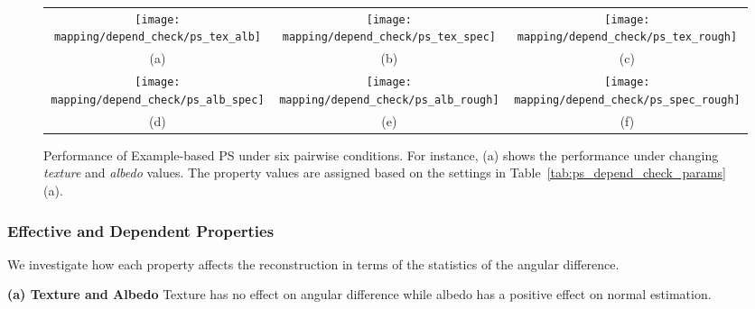 \begin{sidewaysfigure}[!htbp]
\begin{tabular}{ccc}
\texttt{[image: mapping/depend\_check/ps\_tex\_alb]}&
\texttt{[image: mapping/depend\_check/ps\_tex\_spec]}&
\texttt{[image: mapping/depend\_check/ps\_tex\_rough]}\\
(a) & (b) &(c)\\
\texttt{[image: mapping/depend\_check/ps\_alb\_spec]}&
\texttt{[image: mapping/depend\_check/ps\_alb\_rough]}&
\texttt{[image: mapping/depend\_check/ps\_spec\_rough]}\\
(d) & (e) & (f)\\
\end{tabular}
\caption{Performance of Example-based PS under six pairwise conditions. For instance, (a) shows the performance under changing \textit{texture} and \textit{albedo} values. The property values are assigned based on the settings in Table~\ref{tab:ps_depend_check_params} (a).}
\label{fig:ps_depend_check}
\end{sidewaysfigure}

\subsubsection{Effective and Dependent Properties}
We investigate how each property affects the reconstruction in terms of the statistics of the angular difference.

\textbf{(a) Texture and Albedo} 
Texture has no effect on angular difference while albedo has a positive effect on normal estimation.

